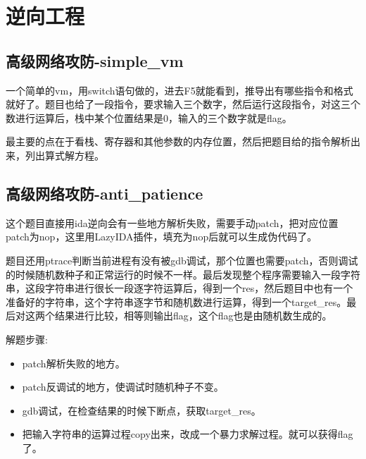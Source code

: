 \chapter{逆向工程}
\section{高级网络攻防-simple\_vm}
一个简单的vm，用switch语句做的，进去F5就能看到，推导出有哪些指令和格式就好了。题目也给了一段指令，要求输入三个数字，然后运行这段指令，对这三个数进行运算后，栈中某个位置结果是0，输入的三个数字就是flag。

最主要的点在于看栈、寄存器和其他参数的内存位置，然后把题目给的指令解析出来，列出算式解方程。

\section{高级网络攻防-anti\_patience}
这个题目直接用ida逆向会有一些地方解析失败，需要手动patch，把对应位置patch为nop，这里用LazyIDA插件，填充为nop后就可以生成伪代码了。

题目还用ptrace判断当前进程有没有被gdb调试，那个位置也需要patch，否则调试的时候随机数种子和正常运行的时候不一样。最后发现整个程序需要输入一段字符串，这段字符串进行很长一段逐字符运算后，得到一个res，然后题目中也有一个准备好的字符串，这个字符串逐字节和随机数进行运算，得到一个target\_res。最后对这两个结果进行比较，相等则输出flag，这个flag也是由随机数生成的。

解题步骤:
\begin{itemize}
    \item patch解析失败的地方。
    \item patch反调试的地方，使调试时随机种子不变。
    \item gdb调试，在检查结果的时候下断点，获取target\_res。
    \item 把输入字符串的运算过程copy出来，改成一个暴力求解过程。就可以获得flag了。
\end{itemize}